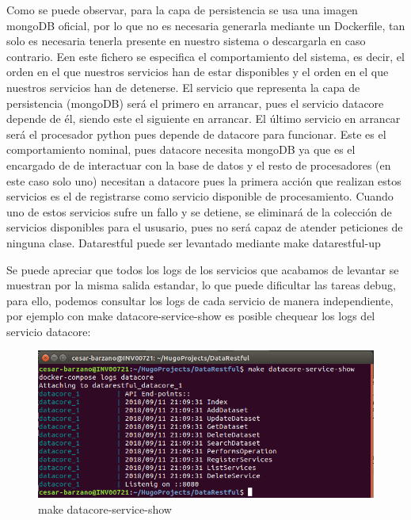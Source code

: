 \documentclass[a4paper,11pt]{book}
\begin{document}
Como se puede observar, para la capa de persistencia se usa una imagen mongoDB oficial, por lo que no es necesaria generarla mediante un Dockerfile, tan solo es necesaria tenerla presente en nuestro sistema o descargarla en caso contrario. Een este fichero se especifica el comportamiento del sistema, es decir, el orden en el que nuestros servicios han de estar disponibles y el orden en el que nuestros servicios han de detenerse.  El servicio que representa la capa de persistencia (mongoDB) será el primero en arrancar, pues el servicio datacore depende de él, siendo este el siguiente en arrancar. El último servicio en arrancar será el procesador python pues depende de datacore para funcionar. Este es el comportamiento nominal, pues datacore necesita mongoDB ya que es el encargado de de interactuar con la base de datos y el resto de procesadores (en este caso solo uno) necesitan a datacore pues la primera acción que realizan estos servicios es el de registrarse como servicio disponible de procesamiento. Cuando uno de estos servicios sufre un fallo y se detiene, se eliminará de la colección de servicios disponibles para el ususario, pues no será capaz de atender peticiones de ninguna clase. Datarestful puede ser levantado mediante make datarestful-up 




Se puede apreciar que todos los logs de los servicios que acabamos de levantar se muestran por la misma salida estandar, lo que puede dificultar las tareas debug, para ello, podemos consultar los logs de cada servicio de manera independiente, por ejemplo con make datacore-service-show es posible chequear los logs del servicio datacore:


\begin{figure}[H]  
\centering 
\includegraphics[scale=0.35]{imagenes/datacore-service-show.png}
\caption{ make datacore-service-show }  
\end{figure} 
\end{document}
